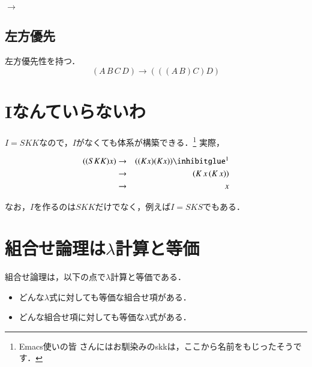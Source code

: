 \begin{center}
\begin{minipage}{9ex}
 \tree{}
  \subtree{}
   \subtree{}
   \endsubtree
  \endsubtree
 \endtree
\end{minipage}
\begin{minipage}{4ex}
 $\rightarrow$
\end{minipage}
\begin{minipage}{9ex}
 \tree{}
   \subtree{}
   \endsubtree
   \subtree{}
   \endsubtree
 \endtree
\end{minipage}
\end{center}

\subsection{左方優先}
左方優先性を持つ．
\[
 (A\, B \, C \, D) \rightarrow (((A \, B)C)D)
\]

\section{Iなんていらないわ}
$I = SKK$なので，$I$がなくても体系が構築できる．\footnote{Emacs使いの皆
さんにはお馴染みのskkは，ここから名前をもじったそうです．}
実際，

\begin{eqnarray*}
 ((SKK) x) &\rightarrow& ((K x)(K x)) \footnotemark \\
 &\rightarrow& (K \, x \, (K \, x)) \\
 &\rightarrow& x
\end{eqnarray*}

なお，$I$を作るのは$SKK$だけでなく，例えば$I = SKS$でもある．

\section{組合せ論理は$\lambda$計算と等価}
組合せ論理は，以下の点で$\lambda$計算と等価である．
\begin{itemize}
 \item どんな$\lambda$式に対しても等価な組合せ項がある．
 \item どんな組合せ項に対しても等価な$\lambda$式がある．
\end{itemize}

